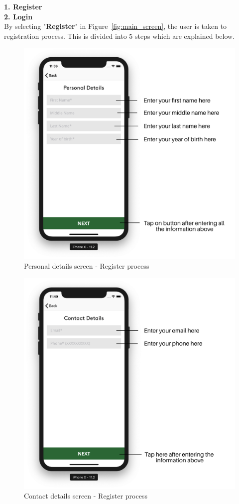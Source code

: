 \begin{itemize}
    \textbf{1. Register} \\
    \textbf{2. Login} \\
    
    By selecting "\textbf{Register}" in Figure~\ref{fig:main_screen}, the user is taken to registration process. This is divided into 5 steps which are explained below.
    
        \begin{figure}[H]
            \centering
            \includegraphics[width=0.50\linewidth]{figures/ch2/register_personal.png}
            \caption{\label{fig:register_personal} Personal details screen - Register process}
        \end{figure}
  
        
        \begin{figure}[H]
            \centering
            \includegraphics[width=0.50\linewidth]{figures/ch2/register_contact.png}
            \caption{\label{fig:register_contact} Contact details screen - Register process}
        \end{figure}
     

\end{itemize}
